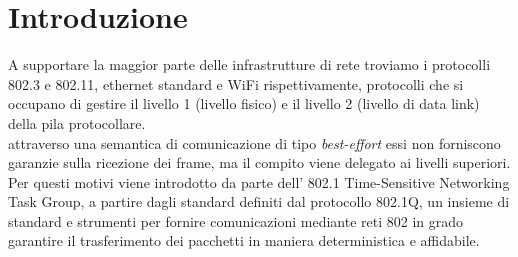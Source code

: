 \documentclass[12pt,a4paper,twoside]{book}
\begin{document}
\setcounter{chapter}{0}
\raggedbottom
\chapter*{Introduzione} \label{chap:intro}

\pagestyle{plain}
\setcounter{page}{1}
\begin{onehalfspace}
A supportare la maggior parte delle infrastrutture di rete troviamo i protocolli 802.3 e 802.11, ethernet standard e WiFi rispettivamente, protocolli che si occupano di gestire il livello 1 (livello fisico) e il livello 2 (livello di data link) della pila protocollare.
\\
attraverso una semantica di comunicazione di tipo \textit{best-effort} essi non forniscono garanzie sulla ricezione dei frame, ma il compito viene delegato ai livelli superiori. 
\\
Per questi motivi viene introdotto da parte dell' 802.1 Time-Sensitive Networking Task Group, a partire dagli standard definiti dal protocollo 802.1Q, un insieme di standard e strumenti per fornire comunicazioni mediante reti 802 in grado garantire il trasferimento dei pacchetti in maniera deterministica e affidabile. \cite{TSN_group}
\\

\end{onehalfspace}
\end{document}
